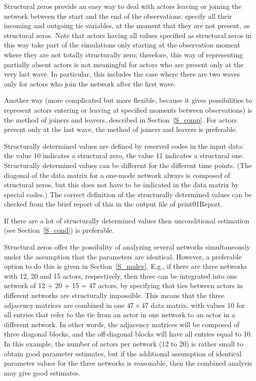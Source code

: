 \documentclass[a4paper,fleqn,11pt]{article}
\newcommand{\+}{\, + \,}
\newcommand{\sfn}[1]{\textsf{#1}}
\begin{document}
Structural zeros provide an easy way to deal with actors leaving
or joining the network between the start and the end
of the observations: specify all their incoming and outgoing tie
variables, at the moment that they are not present, as structural zeros.
Note that actors having all values specified as structural zeros in this way
take part of the simulations only starting at the observation moment
where they are not totally structurally zero;
therefore, this way of representing partially absent actors
is not meaningful for actors who are present only at the very last wave.
In particular, this includes the case where there are two waves only
for actors who join the network after the first wave.

Another way (more complicated but more flexible,
because it gives possibilities to represent actors
entering or leaving at specified moments between observations)
is the method of joiners and leavers, described in Section~\ref{S_comp}.
For actors present only at the last wave, the method of
joiners and leavers is preferable.

Structurally determined values are defined by reserved codes in
the input data: the value 10 indicates a structural zero, the
value 11 indicates a structural one. Structurally determined
values can be different for the different time points. (The
diagonal of the data matrix for a one-mode network
always is composed of structural
zeros, but this does not have to be indicated in the data matrix
by special codes.) The correct definition of the structurally
determined values can be checked from the brief report of this in
the output file of \sfn{print01Report}.

If there are a lot of structurally determined values
then unconditional estimation  (see Section~\ref{S_cond})
is preferable.

Structural zeros offer the possibility of analyzing several
networks simultaneously under the assumption that the parameters
are identical.
However, a preferable option to do this is given in Section~\ref{S_mulev}.
E.g., if there are three networks with 12, 20 and
15 actors, respectively, then these can be integrated into one
network of 12 + 20 + 15 = 47 actors, by specifying that ties
between actors in different networks are structurally impossible.
This means that the three adjacency matrices are combined in one
$47 \times 47$ data matrix, with values 10 for all entries that
refer to the tie from an actor in one network to an actor in a
different network. In other words, the adjacency matrices will be
composed of three diagonal blocks, and the off-diagonal blocks
will have all entries equal to 10. In this example, the number of
actors per network (12 to 20) is rather small to obtain good
parameter estimates, but if the additional assumption of identical
parameter values for the three networks is reasonable, then the
combined analysis may give good estimates.
\end{document}
